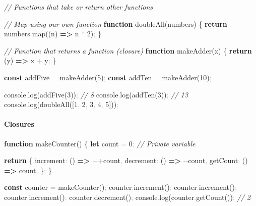 \documentclass[
  justified,
  openright,
]{tufte-book}
\let\subsection\paragraph
\let\paragraph\paragraph
\newcommand{\KeywordTok}[1]{\textcolor{CodeKeyword}{\textbf{#1}}}  %
\newcommand{\CommentTok}[1]{\textcolor{CodeComment}{\textit{#1}}}  %
\newcommand{\CodeNumTok}[1]{\textcolor{CodeNumber}{#1}}             %
\newcommand{\CodeFuncTok}[1]{\textcolor{CodeKeyword}{#1}}           %
\newcommand{\CodeTypeTok}[1]{\textcolor{CodeType}{#1}}              %
\newcommand{\OperatorTok}[1]{\textcolor{DarkGray}{#1}}              %
\newenvironment{Shaded}{%
  \begin{mdframed}[style=TufteCode]%
}{%
  \end{mdframed}%
}
\let\subsection\paragraph
\let\paragraph\paragraph
\begin{document}
\begin{Shaded}
\begin{Highlighting}[]
\CommentTok{// Functions that take or return other functions}
 
\CommentTok{// Map using our own function}
\KeywordTok{function} \CodeFuncTok{doubleAll}(numbers) \{
  \KeywordTok{return} numbers\OperatorTok{.}\CodeFuncTok{map}((n) \KeywordTok{=\textgreater{}} n \OperatorTok{*} \CodeNumTok{2})\OperatorTok{;}
\}
 
\CommentTok{// Function that returns a function (closure)}
\KeywordTok{function} \CodeFuncTok{makeAdder}(x) \{
  \KeywordTok{return} (y) \KeywordTok{=\textgreater{}} x \OperatorTok{+} y\OperatorTok{;}
\}
 
\KeywordTok{const} addFive \OperatorTok{=} \CodeFuncTok{makeAdder}(\CodeNumTok{5})\OperatorTok{;}
\KeywordTok{const} addTen \OperatorTok{=} \CodeFuncTok{makeAdder}(\CodeNumTok{10})\OperatorTok{;}
 
console\OperatorTok{.}\CodeFuncTok{log}(\CodeFuncTok{addFive}(\CodeNumTok{3}))\OperatorTok{;} \CommentTok{// 8}
console\OperatorTok{.}\CodeFuncTok{log}(\CodeFuncTok{addTen}(\CodeNumTok{3}))\OperatorTok{;} \CommentTok{// 13}
console\OperatorTok{.}\CodeFuncTok{log}(\CodeFuncTok{doubleAll}([\CodeNumTok{1}\OperatorTok{,} \CodeNumTok{2}\OperatorTok{,} \CodeNumTok{3}\OperatorTok{,} \CodeNumTok{4}\OperatorTok{,} \CodeNumTok{5}]))\OperatorTok{;}
\end{Highlighting}
\end{Shaded}

\subsection{Closures}\label{closures}

\begin{Shaded}
\begin{Highlighting}[]
\KeywordTok{function} \CodeFuncTok{makeCounter}() \{
  \KeywordTok{let} count \OperatorTok{=} \CodeNumTok{0}\OperatorTok{;} \CommentTok{// Private variable}
 
  \KeywordTok{return} \{
    \CodeTypeTok{increment}\OperatorTok{:} () \KeywordTok{=\textgreater{}} \OperatorTok{++}count\OperatorTok{,}
    \CodeTypeTok{decrement}\OperatorTok{:} () \KeywordTok{=\textgreater{}} \OperatorTok{{-}{-}}count\OperatorTok{,}
    \CodeTypeTok{getCount}\OperatorTok{:} () \KeywordTok{=\textgreater{}} count\OperatorTok{,}
  \}\OperatorTok{;}
\}
 
\KeywordTok{const} counter \OperatorTok{=} \CodeFuncTok{makeCounter}()\OperatorTok{;}
counter\OperatorTok{.}\CodeFuncTok{increment}()\OperatorTok{;}
counter\OperatorTok{.}\CodeFuncTok{increment}()\OperatorTok{;}
counter\OperatorTok{.}\CodeFuncTok{increment}()\OperatorTok{;}
counter\OperatorTok{.}\CodeFuncTok{decrement}()\OperatorTok{;}
console\OperatorTok{.}\CodeFuncTok{log}(counter\OperatorTok{.}\CodeFuncTok{getCount}())\OperatorTok{;} \CommentTok{// 2}
\end{Highlighting}
\end{Shaded}
\end{document}
